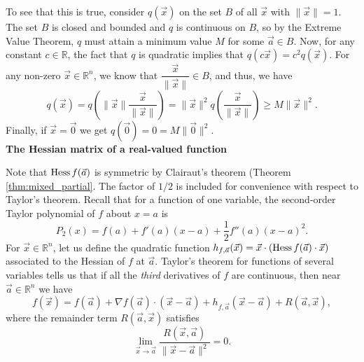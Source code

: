 To see that this is true, consider $q(\vec{x})$ on the set $B$ of all $\vec{x}$ with $\lVert \vec{x}\rVert = 1$. The set $B$ is closed and bounded and $q$ is continuous on $B$, so by the Extreme Value Theorem, $q$ must attain a minimum value $M$ for some $\vec{a}\in B$. Now, for any constant $c\in\mathbb{R}$, the fact that $q$ is quadratic implies that $q(c\vec{x}) = c^2q(\vec{x})$. For any non-zero $\vec{x}\in \mathbb{R}^n$, we know that $\dfrac{\vec{x}}{\lVert\vec{x}\rVert}\in B$, and thus, we have
\[
q(\vec{x}) = q\left(\lVert\vec{x}\rVert\frac{\vec{x}}{\lVert\vec{x}\rVert}\right)=\lVert\vec{x}\rVert^2q\left(\frac{\vec{x}}{\lVert\vec{x}\rVert}\right)\geq M\lVert\vec{x}\rVert^2.
\]
Finally, if $\vec{x}=\vec{0}$ we get $q(\vec{0})=0=M\lVert\vec{0}\rVert^2$.\\


\noindent\textbf{The Hessian matrix of a real-valued function}\\


Note that $\operatorname{Hess} f(\vec{a})$ is symmetric by Clairaut's theorem (Theorem \ref{thm:mixed_partial}. The factor of $1/2$ is included for convenience with respect to Taylor's theorem. Recall that for a function of one variable, the second-order Taylor polynomial of $f$ about $x=a$ is 
\[
P_2(x)=f(a)+f'(a)(x-a)+\frac{1}{2}f''(a)(x-a)^2.
\] 
For $\vec{x}\in\mathbb{R}^n$, let us define the quadratic function $h_{f,\vec{a}}(\vec{x}) = \vec{x}\cdot (\operatorname{Hess} f(\vec{a})\cdot\vec{x})$ associated to the Hessian of $f$ at $\vec{a}$. Taylor's theorem for functions of several variables tells us that if all the {\em third} derivatives of $f$ are continuous, then near $\vec{a}\in\mathbb{R}^n$ we have
\begin{equation}\label{eq_hesstaylor}
f(\vec{x}) = f(\vec{a}) + \nabla f(\vec{a})\cdot (\vec{x}-\vec{a}) + h_{f,\vec{a}}(\vec{x}-\vec{a}) + R(\vec{a},\vec{x}),
\end{equation}
where the remainder term $R(\vec{a},\vec{x})$ satisfies
\begin{equation}\label{eq_remainderorder}
\lim_{\vec{x}\to\vec{a}}\frac{R(\vec{x},\vec{a})}{\lVert \vec{x}-\vec{a}\rVert^2}=0.
\end{equation}


